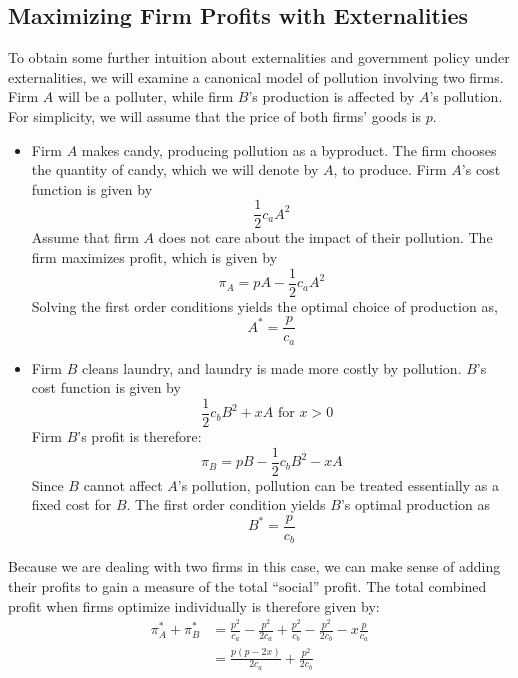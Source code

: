 \subsection*{Maximizing Firm Profits with Externalities}
To obtain some further intuition about externalities and government policy under externalities, we will examine a canonical model of pollution involving two firms. Firm $A$ will be a polluter, while firm $B$'s production is affected by $A$'s pollution. For simplicity, we will assume that the price of both firms' goods is $p$. 
\begin{itemize}
    \item Firm $A$ makes candy, producing pollution as a byproduct. The firm chooses the quantity of candy, which we will denote by $A$, to produce. Firm $A$'s cost function is given by
    \begin{equation*}
        \frac{1}{2} c_a A^2
    \end{equation*}
    Assume that firm $A$ does not care about the impact of their pollution. The firm maximizes profit, which is given by
    \begin{equation*}
        \pi_A = pA - \frac{1}{2} c_a A^2
    \end{equation*}
    Solving the first order conditions yields the optimal choice of production as, 
    \begin{equation*}
        A^* = \frac{p}{c_a}
    \end{equation*}

    \item Firm $B$ cleans laundry, and laundry is made more costly by pollution. $B$'s cost function is given by
    \begin{equation*}
        \frac{1}{2} c_b B^2 + x A \text{ for $x > 0$ }
    \end{equation*}
    Firm $B$'s profit is therefore:
    \begin{equation*}
        \pi_B = pB - \frac{1}{2}c_b B^2 - x A
    \end{equation*}
    Since $B$ cannot affect $A$'s pollution, pollution can be treated essentially as a fixed cost for $B$. The first order condition yields $B$'s optimal production as
    \begin{equation*}
        B^* = \frac{p}{c_b} 
    \end{equation*}
\end{itemize}
Because we are dealing with two firms in this case, we can make sense of adding their profits to gain a measure of the total ``social'' profit. The total combined profit when firms optimize individually is therefore given by:
\begin{equation*}
    \begin{split}
        \pi_A^* + \pi_B^* &= \frac{p^2}{c_a} - \frac{p^2}{2 c_a} + \frac{p^2}{c_b}  - \frac{p^2}{2 c_b} - x \frac{p}{c_a} \\ 
        &= \frac{p (p - 2x) }{2 c_a} + \frac{p^2}{2 c_b}
    \end{split}
\end{equation*}

